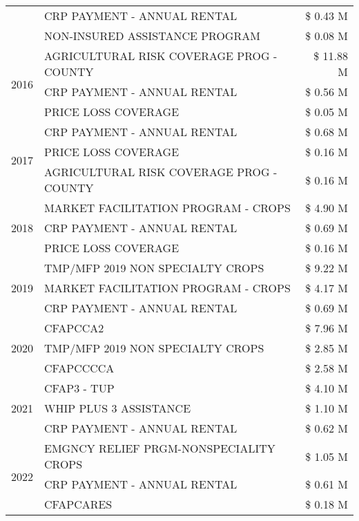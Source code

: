 \begin{tabular}{llr}
 & CRP PAYMENT - ANNUAL RENTAL & \$ 0.43 M \\
 & NON-INSURED ASSISTANCE PROGRAM & \$ 0.08 M \\
\cline{1-3}
\multirow[t]{3}{*}{2016} & AGRICULTURAL RISK COVERAGE PROG - COUNTY & \$ 11.88 M \\
 & CRP PAYMENT - ANNUAL RENTAL & \$ 0.56 M \\
 & PRICE LOSS COVERAGE & \$ 0.05 M \\
\cline{1-3}
\multirow[t]{3}{*}{2017} & CRP PAYMENT - ANNUAL RENTAL & \$ 0.68 M \\
 & PRICE LOSS COVERAGE & \$ 0.16 M \\
 & AGRICULTURAL RISK COVERAGE PROG - COUNTY & \$ 0.16 M \\
\cline{1-3}
\multirow[t]{3}{*}{2018} & MARKET FACILITATION PROGRAM - CROPS & \$ 4.90 M \\
 & CRP PAYMENT - ANNUAL RENTAL & \$ 0.69 M \\
 & PRICE LOSS COVERAGE & \$ 0.16 M \\
\cline{1-3}
\multirow[t]{3}{*}{2019} & TMP/MFP 2019 NON SPECIALTY CROPS & \$ 9.22 M \\
 & MARKET FACILITATION PROGRAM - CROPS & \$ 4.17 M \\
 & CRP PAYMENT - ANNUAL RENTAL & \$ 0.69 M \\
\cline{1-3}
\multirow[t]{3}{*}{2020} & CFAPCCA2 & \$ 7.96 M \\
 & TMP/MFP 2019 NON SPECIALTY CROPS & \$ 2.85 M \\
 & CFAPCCCCA & \$ 2.58 M \\
\cline{1-3}
\multirow[t]{3}{*}{2021} & CFAP3 - TUP & \$ 4.10 M \\
 & WHIP PLUS 3 ASSISTANCE & \$ 1.10 M \\
 & CRP PAYMENT - ANNUAL RENTAL & \$ 0.62 M \\
\cline{1-3}
\multirow[t]{3}{*}{2022} & EMGNCY RELIEF PRGM-NONSPECIALITY CROPS & \$ 1.05 M \\
 & CRP PAYMENT - ANNUAL RENTAL & \$ 0.61 M \\
 & CFAPCARES & \$ 0.18 M \\
\cline{1-3}
\bottomrule
\end{tabular}

